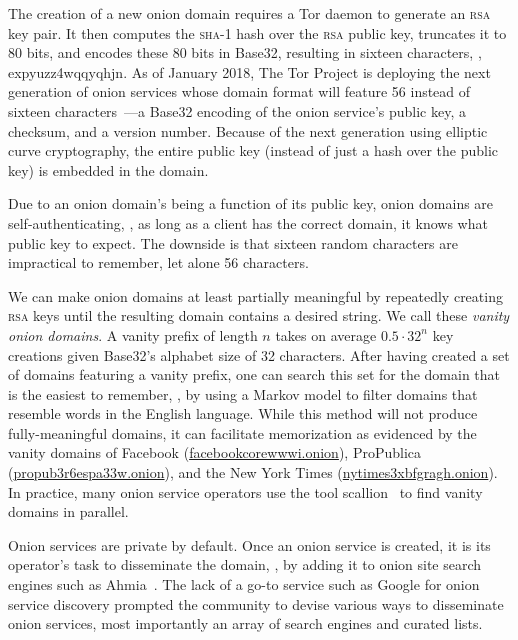 The creation of a new onion domain requires a Tor daemon to generate an
\textsc{rsa} key pair.  It then computes the \textsc{sha}-1 hash over the
\textsc{rsa} public key, truncates it to 80 bits, and encodes these 80 bits in
Base32, resulting in sixteen characters, \eg, expyuzz4wqqyqhjn.  As of January
2018, The Tor Project is deploying the next generation of onion services whose
domain format will feature 56 instead of sixteen
characters~\cite[\S~6]{Mathewson2013a}---a Base32 encoding of the onion
service's public key, a checksum, and a version number.  Because of the next
generation using elliptic curve cryptography, the entire public key (instead of
just a hash over the public key) is embedded in the domain.

Due to an onion domain's being a function of its public key, onion domains are
self-authenticating, \ie, as long as a client has the correct domain, it knows
what public key to expect.  The downside is that sixteen random characters are
impractical to remember, let alone 56 characters.

We can make onion domains at least partially meaningful by repeatedly creating
\textsc{rsa} keys until the resulting domain contains a desired string.  We call
these \emph{vanity onion domains}.  A vanity prefix of length $n$ takes on
average $0.5 \cdot 32^n$ key creations given Base32's alphabet size of 32
characters.  After having created a set of domains featuring a vanity prefix,
one can search this set for the domain that is the easiest to remember, \eg, by
using a Markov model to filter domains that resemble words in the English
language.  While this method will not produce fully-meaningful domains, it can
facilitate memorization as evidenced by the vanity domains of Facebook
(\href{https://www.facebookcorewwwi.onion}{facebookcorewwwi.onion}),
ProPublica
(\href{https://www.propub3r6espa33w.onion}{propub3r6espa33w.onion}),
and the New York Times
(\href{https://www.nytimes3xbfgragh.onion}{nytimes3xbfgragh.onion}).  In
practice, many onion service operators use the tool scallion~\cite{scallion} to
find vanity domains in parallel.

Onion services are private by default.  Once an onion service is created, it is
its operator's task to disseminate the domain, \eg, by adding it to onion site
search engines such as Ahmia~\cite{ahmia}.  The lack of a go-to service such as
Google for onion service discovery prompted the community to devise various ways
to disseminate onion services, most importantly an array of search engines and
curated lists.

